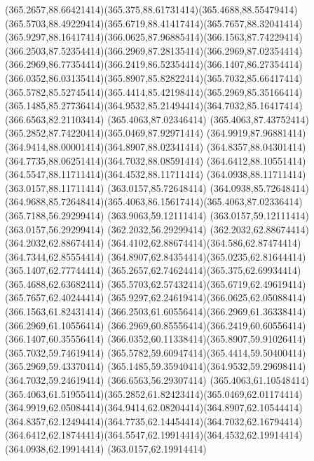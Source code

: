 {{	\curveto(365.2657,88.66421414)(365.375,88.61731414)(365.4688,88.55479414)
	\curveto(365.5703,88.49229414)(365.6719,88.41417414)(365.7657,88.32041414)
	\curveto(365.9297,88.16417414)(366.0625,87.96885414)(366.1563,87.74229414)
	\curveto(366.2503,87.52354414)(366.2969,87.28135414)(366.2969,87.02354414)
	\curveto(366.2969,86.77354414)(366.2419,86.52354414)(366.1407,86.27354414)
	\curveto(366.0352,86.03135414)(365.8907,85.82822414)(365.7032,85.66417414)
	\curveto(365.5782,85.52745414)(365.4414,85.42198414)(365.2969,85.35166414)
	\curveto(365.1485,85.27736414)(364.9532,85.21494414)(364.7032,85.16417414)
	\lineto(366.6563,82.21103414)
	\closepath
	\moveto(365.4063,87.02346414)
	\curveto(365.4063,87.43752414)(365.2852,87.74220414)(365.0469,87.92971414)
	\curveto(364.9919,87.96881414)(364.9414,88.00001414)(364.8907,88.02341414)
	\curveto(364.8357,88.04301414)(364.7735,88.06251414)(364.7032,88.08591414)
	\curveto(364.6412,88.10551414)(364.5547,88.11711414)(364.4532,88.11711414)
	\lineto(364.0938,88.11711414)
	\lineto(363.0157,88.11711414)
	\lineto(363.0157,85.72648414)
	\lineto(364.0938,85.72648414)
	\curveto(364.9688,85.72648414)(365.4063,86.15617414)(365.4063,87.02336414)
	\closepath
	\moveto(365.7188,56.29299414)
	\lineto(363.9063,59.12111414)
	\lineto(363.0157,59.12111414)
	\lineto(363.0157,56.29299414)
	\lineto(362.2032,56.29299414)
	\lineto(362.2032,62.88674414)
	\lineto(364.2032,62.88674414)
	\curveto(364.4102,62.88674414)(364.586,62.87474414)(364.7344,62.85554414)
	\curveto(364.8907,62.84354414)(365.0235,62.81644414)(365.1407,62.77744414)
	\curveto(365.2657,62.74624414)(365.375,62.69934414)(365.4688,62.63682414)
	\curveto(365.5703,62.57432414)(365.6719,62.49619414)(365.7657,62.40244414)
	\curveto(365.9297,62.24619414)(366.0625,62.05088414)(366.1563,61.82431414)
	\curveto(366.2503,61.60556414)(366.2969,61.36338414)(366.2969,61.10556414)
	\curveto(366.2969,60.85556414)(366.2419,60.60556414)(366.1407,60.35556414)
	\curveto(366.0352,60.11338414)(365.8907,59.91026414)(365.7032,59.74619414)
	\curveto(365.5782,59.60947414)(365.4414,59.50400414)(365.2969,59.43370414)
	\curveto(365.1485,59.35940414)(364.9532,59.29698414)(364.7032,59.24619414)
	\lineto(366.6563,56.29307414)
	\closepath
	\moveto(365.4063,61.10548414)
	\curveto(365.4063,61.51955414)(365.2852,61.82423414)(365.0469,62.01174414)
	\curveto(364.9919,62.05084414)(364.9414,62.08204414)(364.8907,62.10544414)
	\curveto(364.8357,62.12494414)(364.7735,62.14454414)(364.7032,62.16794414)
	\curveto(364.6412,62.18744414)(364.5547,62.19914414)(364.4532,62.19914414)
	\lineto(364.0938,62.19914414)
	\lineto(363.0157,62.19914414)
}}
